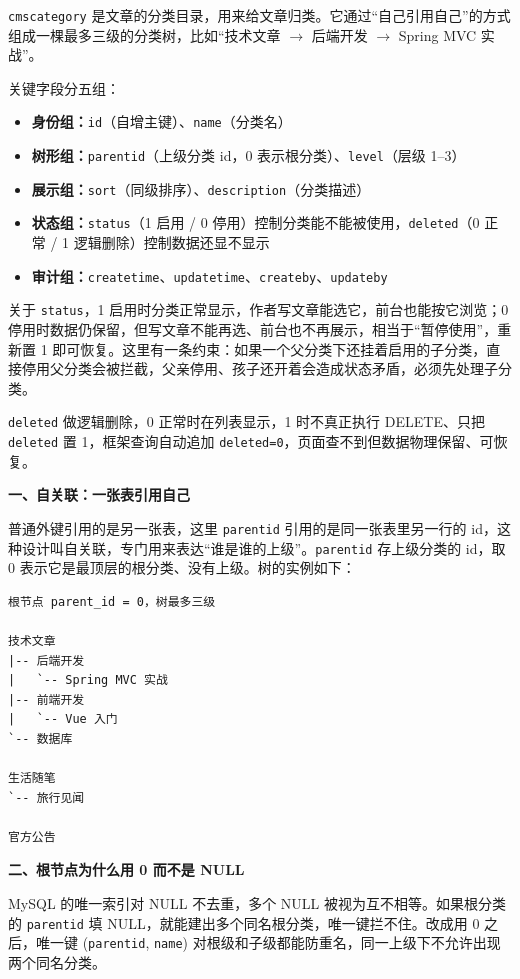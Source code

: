 \documentclass[zihao=-4,UTF8,openany]{ctexart}
\renewcommand{\_}{\textunderscore\allowbreak}
\begin{document}
\texttt{cms\_category} 是文章的分类目录，用来给文章归类。它通过“自己引用自己”的方式组成一棵最多三级的分类树，比如“技术文章 $\rightarrow$ 后端开发 $\rightarrow$ Spring MVC 实战”。

关键字段分五组：

\begin{itemize}
\item \textbf{身份组：}\texttt{id}（自增主键）、\texttt{name}（分类名）
\item \textbf{树形组：}\texttt{parent\_id}（上级分类 id，0 表示根分类）、\texttt{level}（层级 1--3）
\item \textbf{展示组：}\texttt{sort}（同级排序）、\texttt{description}（分类描述）
\item \textbf{状态组：}\texttt{status}（1 启用 / 0 停用）控制分类能不能被使用，\texttt{deleted}（0 正常 / 1 逻辑删除）控制数据还显不显示
\item \textbf{审计组：}\texttt{create\_time}、\texttt{update\_time}、\texttt{create\_by}、\texttt{update\_by}
\end{itemize}

关于 \texttt{status}，1 启用时分类正常显示，作者写文章能选它，前台也能按它浏览；0 停用时数据仍保留，但写文章不能再选、前台也不再展示，相当于“暂停使用”，重新置 1 即可恢复。这里有一条约束：如果一个父分类下还挂着启用的子分类，直接停用父分类会被拦截，父亲停用、孩子还开着会造成状态矛盾，必须先处理子分类。

\texttt{deleted} 做逻辑删除，0 正常时在列表显示，1 时不真正执行 DELETE、只把 \texttt{deleted} 置 1，框架查询自动追加 \texttt{deleted=0}，页面查不到但数据物理保留、可恢复。

\noindent\textbf{一、自关联：一张表引用自己}

普通外键引用的是另一张表，这里 \texttt{parent\_id} 引用的是同一张表里另一行的 id，这种设计叫自关联，专门用来表达“谁是谁的上级”。\texttt{parent\_id} 存上级分类的 id，取 0 表示它是最顶层的根分类、没有上级。树的实例如下：

\begin{verbatim}
根节点 parent_id = 0，树最多三级

技术文章
|-- 后端开发
|   `-- Spring MVC 实战
|-- 前端开发
|   `-- Vue 入门
`-- 数据库

生活随笔
`-- 旅行见闻

官方公告
\end{verbatim}

\noindent\textbf{二、根节点为什么用 0 而不是 NULL}

MySQL 的唯一索引对 NULL 不去重，多个 NULL 被视为互不相等。如果根分类的 \texttt{parent\_id} 填 NULL，就能建出多个同名根分类，唯一键拦不住。改成用 0 之后，唯一键 (\texttt{parent\_id}, \texttt{name}) 对根级和子级都能防重名，同一上级下不允许出现两个同名分类。
\end{document}
